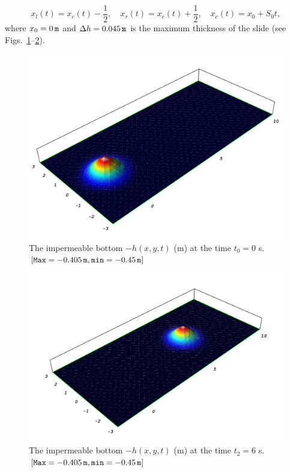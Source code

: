 \begin{equation}
  \label{eq:lopes:bottom4}
  x_l(t)=x_c(t)-\frac{1}{2},\quad
  x_r(t)=x_c(t)+\frac{1}{2},\quad x_c(t)=x_0+S_0t,
\end{equation}
where $x_0=0\, {\tt m}$ and $\Delta h=0.045\, {\tt
m}$ is the maximum thickness of the slide (see
Figs.~\ref{fig:lopes:objectbottom}--\ref{fig:lopes:objectbottom2}).

\begin{figure}
  \centering
  \includegraphics[width=\largefig]{chapters/lopes/pdf/depth0.pdf}
  \caption{The impermeable bottom $-h(x,y,t)$ (m) at the time $t_0=0$
    s. $[{\tt Max}= -0.405\, {\tt m}, {\tt min}=-0.45\,{\tt m}]$}
  \label{fig:lopes:objectbottom}
\end{figure}

\begin{figure}
  \centering
  \includegraphics[width=\largefig]{chapters/lopes/pdf/depth6.pdf}
  \caption{The impermeable bottom $-h(x,y,t)$ (m) at the time $t_2=6$
    s. $[{\tt Max}= -0.405\, {\tt m}, {\tt min}=-0.45\,{\tt m}]$}
  \label{fig:lopes:objectbottom2}
\end{figure}

